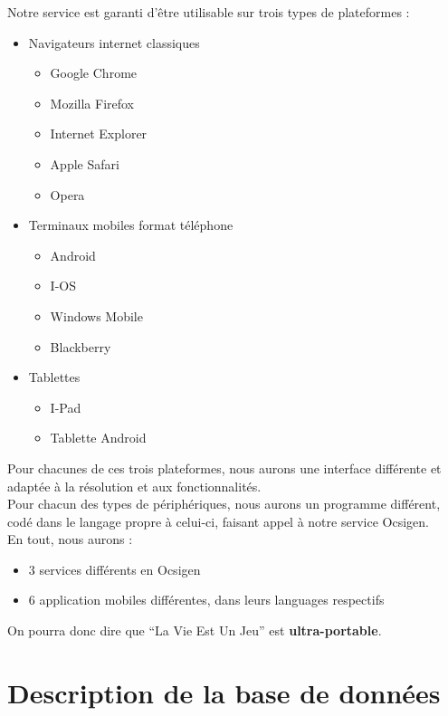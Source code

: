 \documentclass{life-fr}
\begin{document}
Notre service est garanti d'être utilisable sur trois types de plateformes :
\begin{itemize}
  \item Navigateurs internet classiques
    \begin{itemize}
      \item Google Chrome
      \item Mozilla Firefox
      \item Internet Explorer
      \item Apple Safari
      \item Opera
    \end{itemize}
  \item Terminaux mobiles format téléphone
    \begin{itemize}
      \item Android
      \item I-OS
      \item Windows Mobile
      \item Blackberry
    \end{itemize}
  \item Tablettes
    \begin{itemize}
      \item I-Pad
      \item Tablette Android
    \end{itemize}
\end{itemize}

Pour chacunes de ces trois plateformes, nous aurons une interface différente
et adaptée à la résolution et aux fonctionnalités.\\
Pour chacun des types de périphériques, nous aurons un programme différent,
codé dans le langage propre à celui-ci, faisant appel à notre service Ocsigen.\\
En tout, nous aurons :
\begin{itemize}
  \item 3 services différents en Ocsigen
  \item 6 application mobiles différentes, dans leurs languages respectifs
\end{itemize}

On pourra donc dire que ``La Vie Est Un Jeu'' est \textbf{ultra-portable}.


\chapter{Description de la base de données}
\end{document}
